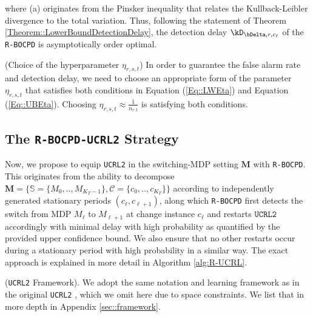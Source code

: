 \documentclass{article} %
\begin{document}
where (a) originates from the Pinsker inequality that relates the Kullback-Leibler divergence to the total variation. Thus, following the statement of Theorem \ref{Theorem::LowerBoundDetectionDelay}, the detection delay $\kD_{\bDelta,r,c_\ell}$ of the \texttt{R-BOCPD} is asymptotically order optimal.

\begin{discussion}{(Choice of the hyperparameter $\eta_{r,s,t}$)}
    In order to guarantee the false alarm rate and detection delay, we need to choose an appropriate form of the parameter $\eta_{r,s,t}$ that satisfies both conditions in Equation (\ref{Eq::LWEta}) and Equation (\ref{Eq::UBEta}). Choosing $\eta_{r,s,t} \approx \frac{1}{n_{r:t}}$ is satisfying both conditions.
\end{discussion}

\subsection{The \texttt{R-BOCPD-UCRL2} Strategy}

Now, we propose to equip \texttt{UCRL2} in the switching-MDP setting $\mathbf{M}$ with \texttt{R-BOCPD}. This originates from the ability  
to decompose $\mathbf{M} = \{\mathbb{S}=\{M_0,..,M_{K_T-1}\}, \mathcal{C}=\{c_0,..,c_{K_T}\}\}$ according to independently generated stationary periods $(c_\ell, c_{\ell+1})$, along which \texttt{R-BOCPD} first detects the switch from MDP $M_\ell$ to $M_{\ell+1}$ at change instance $c_\ell$ and restarts $\texttt{UCRL2}$ accordingly with minimal delay with high probability as quantified by the provided upper confidence bound. We also ensure that no other restarts occur during a stationary period with high probability in a similar way. The exact approach is explained in more detail in Algorithm \ref{alg:R-UCRL}.

\begin{definition}{(\texttt{UCRL2} Framework).}
We adopt the same notation and learning framework as in the original \texttt{UCRL2} \cite{auer2008near}, which we omit here due to space constraints. We list that in more depth in Appendix \ref{sec::framework}. 
\end{definition}
\end{document}
